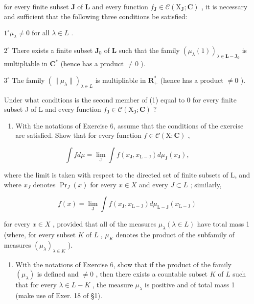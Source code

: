 for every finite subset \(\mathbf{J}\) of \(\mathbf{L}\) and every function \(f_{\mathbf{J}} \in \mathcal{C}(\mathrm{X}_{\mathbf{J}}; \mathbf{C})\) , it is necessary and sufficient that the following three conditions be satisfied:

\(1^{\circ} \mu_{\lambda} \neq 0\) for all \(\lambda \in L\) .

\(2^{\circ}\) There exists a finite subset \(\mathbf{J}_0\) of \(\mathbf{L}\) such that the family \((\mu_{\lambda}(1))_{\lambda \in \mathbf{L} - \mathbf{J}_0}\) is multipliable in \(\mathbf{C}^*\) (hence has a product \(\neq 0\) ).

\(3^{\circ}\) The family \((\| \mu_{\lambda}\|)_{\lambda \in L}\) is multipliable in \(\mathbf{R}_{+}^{*}\) (hence has a product \(\neq 0\) ).

Under what conditions is the second member of (1) equal to 0 for every finite subset J of L and every function \(f_{\mathrm{J}} \in \mathcal{C}(\mathrm{X}_{\mathrm{J}}; \mathbf{C})\) ?

\begin{enumerate}
\def\labelenumi{\arabic{enumi})}
\setcounter{enumi}{6}
\tightlist
\item
  With the notations of Exercise 6, assume that the conditions of the exercise are satisfied. Show that for every function \(f \in \mathcal{C}(\mathrm{X};\mathbf{C})\) ,
\end{enumerate}

\[
\int f d \mu = \lim _ {\mathrm{J}} \int f (x _ {\mathrm{J}}, x _ {\mathrm{L} - \mathrm{J}}) d \mu_ {\mathrm{J}} (x _ {\mathrm{J}}),
\]

where the limit is taken with respect to the directed set of finite subsets of L, and where \(x_{J}\) denotes \(\Pr_{J}(x)\) for every \(x \in X\) and every \(J \subset L\) ; similarly,

\[
f (x) = \lim _ {\mathrm{J}} \int f (x _ {\mathrm{J}}, x _ {\mathrm{L} - \mathrm{J}}) d \mu_ {\mathrm{L} - \mathrm{J}} (x _ {\mathrm{L} - \mathrm{J}})
\]

for every \(x \in X\) , provided that all of the measures \(\mu_{\lambda} (\lambda \in L)\) have total mass 1 (where, for every subset \(K\) of \(L\) , \(\mu_{K}\) denotes the product of the subfamily of measures \((\mu_{\lambda})_{\lambda \in K}\) ).

\begin{enumerate}
\def\labelenumi{\arabic{enumi})}
\setcounter{enumi}{7}
\tightlist
\item
  With the notations of Exercise 6, show that if the product of the family \((\mu_{\lambda})\) is defined and \(\neq 0\) , then there exists a countable subset \(K\) of \(L\) such that for every \(\lambda \in L - K\) , the measure \(\mu_{\lambda}\) is positive and of total mass 1 (make use of Exer. 18 of §1).
\end{enumerate}

